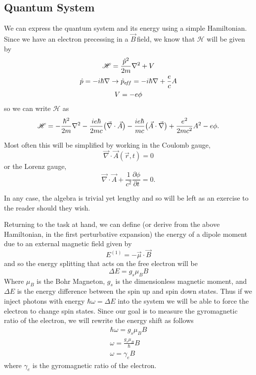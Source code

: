 \documentclass{article}
\newcommand{\diverg}[1]{\ensuremath{\vec{\nabla} \cdot {#1}}}
\newcommand{\B}{$\vec{B}\,$}
\begin{document}
	\subsection{Quantum System}
	We can express the quantum system and its energy using a simple Hamiltonian.  Since we have an electron precessing in a \B field, we know that $\mathscr{H}$ will be given by
	\begin{gather*}
		\mathscr{H} = \frac{\hat{p}^2}{2m} \nabla^2 + V\\
		\hat{p} = -i\hbar \nabla \rightarrow \hat{p}_{\tiny{e\!f\!f}} = -i\hbar \nabla + \frac{e}{c}A\\
		V = -e\phi\\
	\end{gather*}
	so we can write $\mathscr{H}$ as
	\begin{equation}
		\mathscr{H} = -\frac{\hbar^2}{2m} \nabla^2 -\frac{ie\hbar}{2mc} \big{(}\vec{\nabla}\cdot\vec{A}\big{)} - \frac{ie\hbar}{mc}\big{(}\vec{A}\cdot\vec{\nabla}\big{)} + \frac{e^2}{2mc^2}A^2 - e\phi.
	\end{equation}

	Most often this will be simplified by working in the Coulomb gauge, 
	\begin{equation*}
		\diverg{\vec{A}(\vec{r},t)} = 0
	\end{equation*}
	or the Lorenz gauge,
	\begin{equation*}
		\diverg{\vec{A}} + \frac{1}{c^2}\frac{\partial \phi}{\partial t} = 0.
	\end{equation*}

	In any case, the algebra is trivial yet lengthy and so will be left as an exercise to the reader should they wish.

	\vspace{.25cm}

	Returning to the task at hand, we can define (or derive from the above Hamiltonian, in the first perturbative expansion) the energy of a dipole moment due to an external magnetic field given by
	\begin{equation*}
		E^{(1)} = -\vec{\mu} \cdot \vec{B}
	\end{equation*}
	and so the energy splitting that acts on the free electron will be
	\begin{equation*}
		\Delta E = g_s\mu_B B
	\end{equation*}
	Where $\mu_B$ is the Bohr Magneton, $g_s$ is the dimensionless magnetic moment, and $\Delta E$ is the energy difference between the spin up and spin down states.  Thus if we inject photons with energy $\hbar \omega = \Delta E$ into the system we will be able to force the electron to change spin states.  Since our goal is to measure the gyromagnetic ratio of the electron, we will rewrite the energy shift as follows
	\begin{gather*}
		\hbar \omega = g_s\mu_B B\\
		\omega = \frac{g_s \mu_B}{\hbar} B\\
		\omega = \gamma_e B
	\end{gather*}
	where $\gamma_e$ is the gyromagnetic ratio of the electron. 
\end{document}
